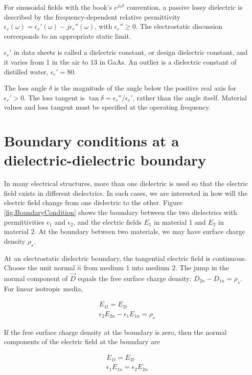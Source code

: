 \documentclass{ximera}
\begin{document}
For sinusoidal fields with the book's $e^{j\omega t}$ convention, a passive lossy dielectric is described by the frequency-dependent relative permittivity $\epsilon_r(\omega)=\epsilon_r'(\omega)-j\epsilon_r''(\omega)$, with $\epsilon_r''\geq0$. The electrostatic discussion corresponds to an appropriate static limit.

$\epsilon_r{'}$ in data sheets is called a dielectric constant, or design dielectric constant, and it varies from 1 in the air to 13 in GaAs. An outlier is a dielectric constant of distilled water, $\epsilon_r{'}=80$.

The loss angle $\delta$ is the magnitude of the angle below the positive real axis for $\epsilon_r'>0$. The loss tangent is $\tan\delta=\epsilon_r''/\epsilon_r'$, rather than the angle itself. Material values and loss tangent must be specified at the operating frequency.

\section{Boundary conditions at a dielectric-dielectric boundary}



In many electrical structures, more than one dielectric is used so that the electric field exists in different dielectrics. In such cases, we are interested in how will the electric field change from one dielectric to the other. Figure \ref{fig:BoundaryCondition} shows the boundary between the two dielectrics with permittivities $\epsilon_1$ and $\epsilon_2$, and the electric fields $E_1$ in material 1 and $E_2$ in material 2. At the boundary between two materials, we may have surface charge density $\rho_s$.

At an electrostatic dielectric boundary, the tangential electric field is continuous. Choose the unit normal $\hat{n}$ from medium 1 into medium 2. The jump in the normal component of $\vec{D}$ equals the free surface charge density: $D_{2n}-D_{1n}=\rho_s$. For linear isotropic media,


\begin{eqnarray}
E_{1t}=E_{2t} \\
\epsilon_2 E_{2n}-\epsilon_1 E_{1n}=\rho_s
\end{eqnarray} 

If the free surface charge density at the boundary is zero, then the normal components of the electric field at the boundary are


\begin{eqnarray}
E_{1t}=E_{2t} \\
\epsilon_1 E_{1n}=\epsilon_2 E_{2n}
\end{eqnarray} 
\end{document}
